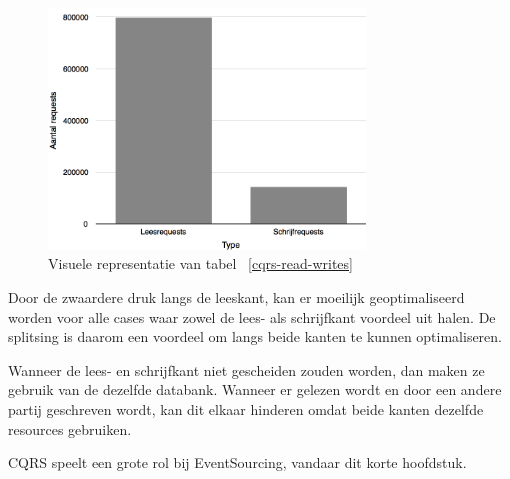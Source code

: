 
\begin{figure}[h]
\caption{Visuele representatie van tabel ~\ref{cqrs-read-writes}}
\centering
\includegraphics[width=0.75\textwidth]{img/lees-en-schrijfkant}
\end{figure}

Door de zwaardere druk langs de leeskant, kan er moeilijk geoptimaliseerd worden voor alle cases waar zowel de lees- als schrijfkant voordeel uit halen. De splitsing is daarom een voordeel om langs beide kanten te kunnen optimaliseren.

Wanneer de lees- en schrijfkant niet gescheiden zouden worden, dan maken ze gebruik van de dezelfde databank. Wanneer er gelezen wordt en door een andere partij geschreven wordt, kan dit elkaar hinderen omdat beide kanten dezelfde resources gebruiken.

\gls{CQRS} speelt een grote rol bij EventSourcing, vandaar dit korte hoofdstuk.
